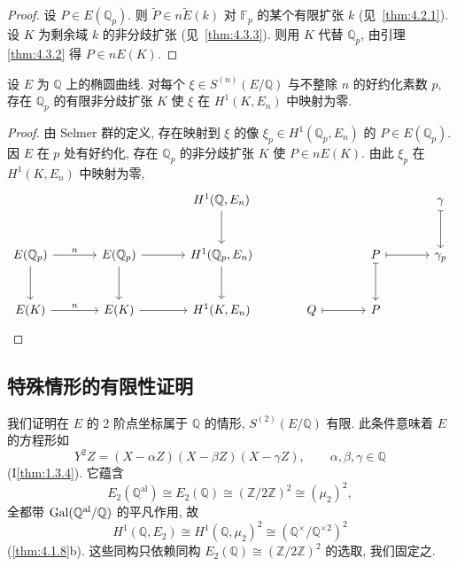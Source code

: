 \begin{proof}
设 $P\in E(\mathbb{Q}_p)$. 则 $\tilde{P}\in n\tilde{E}(k)$ 对 $\mathbb{F}_p$ 的某个有限扩张 $k$ (见~\ref{thm:4.2.1}). 设 $K$ 为剩余域 $k$ 的非分歧扩张 (见~\ref{thm:4.3.3}). 则用 $K$ 代替 $\mathbb{Q}_p$, 由引理 \ref{thm:4.3.2} 得 $P\in nE(K)$.
\end{proof}

\begin{proposition} \label{thm:4.3.6} 
设 $E$ 为 $\mathbb{Q}$ 上的椭圆曲线. 对每个 $\xi\in S^{(n)}(E/\mathbb{Q})$ 与不整除 $n$ 的好约化素数 $p$, 存在 $\mathbb{Q}_p$ 的有限非分歧扩张 $K$ 使 $\xi$ 在 $H^1(K, E_n)$ 中映射为零.
\end{proposition}

\begin{proof}
由 Selmer 群的定义, 存在映射到 $\xi$ 的像 $\xi_p\in H^1(\mathbb{Q}_p, E_n)$ 的 $P\in E(\mathbb{Q}_p)$. 因 $E$ 在 $p$ 处有好约化, 存在 $\mathbb{Q}_p$ 的非分歧扩张 $K$ 使 $P\in nE(K)$. 由此 $\xi_p$ 在 $H^1(K, E_n)$ 中映射为零,
\[
\begin{tikzcd}[
    row sep=large, 
    column sep=large,
    mapsto/.style={|->}
]
    & & H^1(\mathbb{Q}, E_n) \dar & & & \gamma \dar[mapsto] \\
    E(\mathbb{Q}_p) \rar["n"] \dar & E(\mathbb{Q}_p) \rar \dar & H^1(\mathbb{Q}_p, E_n) \dar & & P \rar[mapsto] \dar[mapsto] & \gamma_p \\
    E(K) \rar["n"] & E(K) \rar & H^1(K, E_n) & Q \rar[mapsto] & P & 
\end{tikzcd}
\]
\end{proof}

\subsection*{特殊情形的有限性证明}

我们证明在 $E$ 的 2 阶点坐标属于 $\mathbb{Q}$ 的情形, $S^{(2)}(E/\mathbb{Q})$ 有限. 此条件意味着 $E$ 的方程形如
\[
Y^2Z = (X-\alpha Z)(X-\beta Z)(X-\gamma Z), \qquad \alpha, \beta, \gamma\in\mathbb{Q}
\]
(I\ref{thm:1.3.4}). 它蕴含
\[
E_2(\mathbb{Q}^{\mathrm{al}})\cong E_2(\mathbb{Q})\cong(\mathbb{Z}/2\mathbb{Z})^2\cong(\mu_2)^2,
\]
全都带 $\operatorname{Gal}(\mathbb{Q}^{\mathrm{al}}/\mathbb{Q})$ 的平凡作用, 故
\[
H^1(\mathbb{Q}, E_2)\cong H^1(\mathbb{Q}, \mu_2)^2\cong(\mathbb{Q}^{\times}/\mathbb{Q}^{\times2})^2
\]
(\ref{thm:4.1.8}b). 这些同构只依赖同构 $E_2(\mathbb{Q})\cong(\mathbb{Z}/2\mathbb{Z})^2$ 的选取, 我们固定之.

